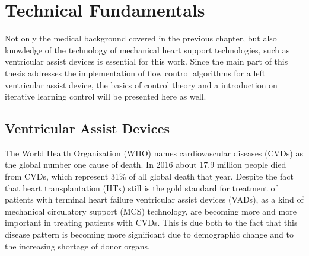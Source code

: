 \chapter{Technical Fundamentals}
Not only the medical background covered in the previous chapter, but also knowledge of the technology of mechanical heart support technologies, such as ventricular assist devices is essential for this work.
Since the main part of this thesis addresses the implementation of flow control algorithms for a left ventricular assist device, the basics of control theory and a introduction on iterative learning control will be presented here as well.

\section{Ventricular Assist Devices}
The World Health Organization (WHO) names cardiovascular diseases (CVDs) as the global number one cause of death. In 2016 about 17.9 million people died from    CVDs, which represent 31{\%} of all global death that year.\cite{WHO} Despite the fact that heart transplantation (HTx) still is the gold standard for treatment of patients with terminal heart failure \cite{VAD2} ventricular assist devices (VADs), as a kind of mechanical circulatory support (MCS) technology, are becoming more and more important in treating patients with CVDs. This is due both to the fact that this disease pattern is becoming more significant due to demographic change and to the increasing shortage of donor organs.\cite{VAD7}

